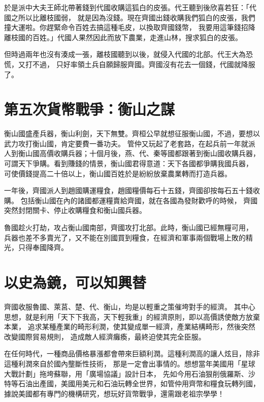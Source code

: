 於是派中大夫王師北帶著錢到代國收購這狐白的皮張。代王聽到後欣喜若狂：「代國之所以比離枝國弱，
就是因為沒錢。現在齊國出錢收購我們狐白的皮張，我們撞大運啦。你趕緊命令百姓去搞這種毛皮，以換取齊國錢幣，
我要用這筆錢招降離枝國的百姓。」代國人果然因此而放下農業，走進山林，搜求狐白的皮張。

但時過兩年也沒有湊成一張，離枝國聽到以後，就侵入代國的北部。代王大為恐慌，又打不過，
只好率領土兵自願歸服齊國。齊國沒有花去一個錢，代國就降服了。

\section{第五次貨幣戰爭：衡山之謀}
衡山國盛產兵器，衡山利劍，天下無雙。齊桓公早就想征服衡山國，不過，要想以武力攻打衡山國，肯定要費一番功夫。
管仲又玩起了老套路，在起兵前一年就派人到衡山國高價收購兵器；十個月後，燕、代、秦等國都跟著到衡山國收購兵器，
可謂天下爭購。看到賺錢的情景，衡山國君得意道：天下各國都爭購我國兵器，
可使價錢提高二十倍以上，衡山國百姓於是紛紛放棄農業轉而打造兵器。

一年後，齊國派人到趙國購運糧食，趙國糧價每石十五錢，齊國卻按每石五十錢收購。
包括衡山國在內的諸國都運糧賣給齊國，就在各國為發財歡呼的時候，
齊國突然封閉關卡、停止收購糧食和衡山國兵器。

魯國趁火打劫，攻占衡山國南部，齊國攻打北部。此時，衡山國已經無糧可用，
兵器也差不多賣光了，又不能在別國買到糧食，在經濟和軍事兩個戰場上敗的精光，只得奉國降齊。


\section{以史為鏡，可以知興替}
齊國收服魯國、萊莒、楚、代、衡山，均是以輕重之策催垮對手的經濟。
其中心思想，就是利用「天下下我高，天下輕我重」的經濟原則，即以高價誘使敵方放棄本業，
追求某種產業的畸形利潤，使其變成單一經濟，產業結構畸形，然後突然改變國際貿易規則，
造成敵人經濟癱瘓，最終迫使其完全臣服。

在任何時代，一種商品價格暴漲都會帶來巨額利潤。這種利潤高的讓人炫目，除非這種利潤來自於國內壟斷性技術，
那是一定會出事情的。想想當年美國用「星球大戰計劃」拖垮蘇聯，用「廣場協議」設計日本，
先如今用石油狠削俄羅斯、沙特等石油出產國，美國用美元和石油玩轉全世界，如管仲用齊幣和糧食玩轉列國，
據說美國都有專門的機構研究，想玩好貨幣戰爭，還需跟老祖宗學學！
